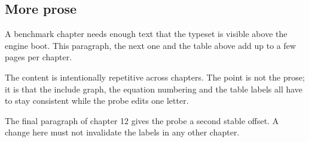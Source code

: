 \subsection{More prose}
A benchmark chapter needs enough text that the type\-set is visible above the
engine boot. This paragraph, the next one and the table above add up to a few
pages per chapter.

The content is intentionally repetitive across chapters. The point is not the
prose; it is that the include graph, the equation numbering and the table
labels all have to stay consistent while the probe edits one letter.

The final paragraph of chapter 12 gives the probe a second stable offset. A
change here must not invalidate the labels in any other chapter.
